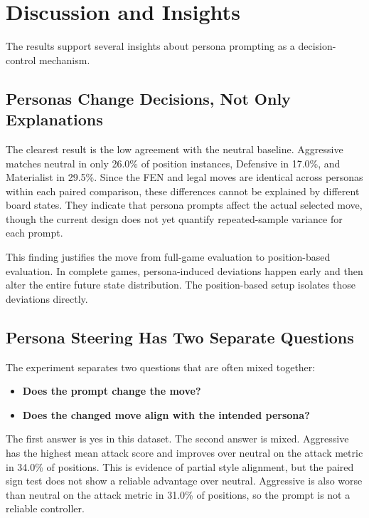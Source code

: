 \documentclass[10pt]{article}
\begin{document}
\FloatBarrier

\section{Discussion and Insights}

The results support several insights about persona prompting as a decision-control mechanism.

\subsection{Personas Change Decisions, Not Only Explanations}

The clearest result is the low agreement with the neutral baseline. Aggressive matches neutral in only 26.0\% of position instances, Defensive in 17.0\%, and Materialist in 29.5\%. Since the FEN and legal moves are identical across personas within each paired comparison, these differences cannot be explained by different board states. They indicate that persona prompts affect the actual selected move, though the current design does not yet quantify repeated-sample variance for each prompt.

This finding justifies the move from full-game evaluation to position-based evaluation. In complete games, persona-induced deviations happen early and then alter the entire future state distribution. The position-based setup isolates those deviations directly.

\subsection{Persona Steering Has Two Separate Questions}

The experiment separates two questions that are often mixed together:

\begin{itemize}
    \item \textbf{Does the prompt change the move?}
    \item \textbf{Does the changed move align with the intended persona?}
\end{itemize}

The first answer is yes in this dataset. The second answer is mixed. Aggressive has the highest mean attack score and improves over neutral on the attack metric in 34.0\% of positions. This is evidence of partial style alignment, but the paired sign test does not show a reliable advantage over neutral. Aggressive is also worse than neutral on the attack metric in 31.0\% of positions, so the prompt is not a reliable controller.
\end{document}
